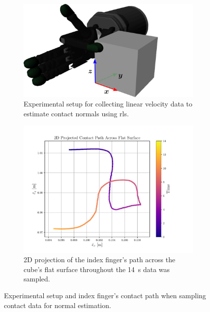 \begin{figure}[!h]
	\centering
	\begin{subfigure}[b]{0.48\textwidth}
		\centering
		\includegraphics[width=\textwidth]{chapters/1-tactile-perception/fig/inkscape/flat-contact-coor.pdf}
		\caption{Experimental setup for collecting linear velocity data to estimate contact normals using \gls{rls}.}
		\label{fig:flat-contact-coor}
	\end{subfigure}
	\hfill
	\begin{subfigure}[b]{0.48\textwidth}
		\centering
		\includegraphics[width=\textwidth]{chapters/1-tactile-perception/fig/matplotlib/2d-projected-contact-path-across-flat-surface.pdf}
		\caption{2D projection of the index finger's path across the cube's flat surface throughout the \SI{14}{\second} data was sampled.}
		\label{fig:2d-projected-contact-path-across-flat-surface}
	\end{subfigure}
		\caption{Experimental setup and index finger's contact path when sampling contact data for normal estimation.}
		\label{fig:experimental-setup-for-normal-estimation}
\end{figure}

